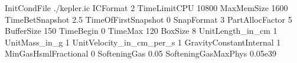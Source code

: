 InitCondFile                          ./kepler.ic
ICFormat                              2
TimeLimitCPU                          10800 %
MaxMemSize                            1600
TimeBetSnapshot                       2.5
TimeOfFirstSnapshot                   0
SnapFormat                            3
PartAllocFactor                       5
BufferSize                            150
TimeBegin                             0
TimeMax                               120
BoxSize                               8
UnitLength_in_cm                      1
UnitMass_in_g                         1
UnitVelocity_in_cm_per_s              1
GravityConstantInternal               1
MinGasHsmlFractional                  0
SofteningGas                          0.05
SofteningGasMaxPhys                   0.05e39

